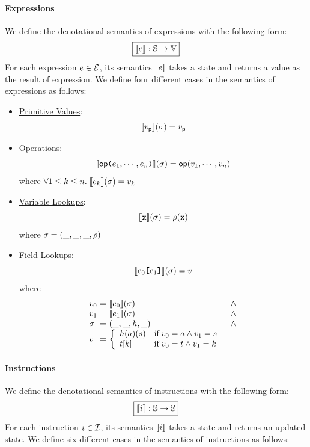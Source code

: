 \paragraph{Expressions} We define the denotational semantics of expressions with
the following form:
\[
  \framebox{$\sem{\expr}: \stset \rightarrow \valset$}
\]
For each expression $e \in \mathcal{E}$, its semantics $\llbracket{e}\rrbracket$ takes a
state and returns a value as the result of expression. We define four different
cases in the semantics of expressions as
follows:
\begin{itemize}
  \item \underline{Primitive Values}:
    \[
      \llbracket{v_{\textsf{p}}}\rrbracket(\sigma) = v_{\textsf{p}}
    \]

  \item \underline{Operations}:
    \[
      \llbracket{\textsf{op}\texttt{(}e_1, \cdots, e_n \texttt{)}}\rrbracket(\sigma) =
      \textsf{op}(v_1, \cdots, v_n)
    \]
    where $\forall 1 \leq k \leq n. \; \llbracket{e_k}\rrbracket(\sigma) = v_k$

  \item \underline{Variable Lookups}:
    \[
      \llbracket{\texttt{x}}\rrbracket(\sigma) = \rho(\texttt{x})
    \]
    where $\sigma = (\_, \_, \_, \rho)$

  \item \underline{Field Lookups}:
    \[
      \llbracket{e_0 \texttt{[}e_1 \texttt{]}}\rrbracket(\sigma) = v
    \]
    where
    \[
      \begin{array}{l@{~}c@{~}ll}
        \val_0 &=& \sem{\expr_0}(\st) &\wedge\\
        \val_1 &=& \sem{\expr_1}(\st) &\wedge\\
        \st &=& (\_, \_, \heap, \_) &\wedge\\
        \val &=& \left\{
          \begin{array}{ll}
            \heap(\addr)(\str)
            & \text{if} \; \val_0 = \addr \wedge \val_1 = \str\\
            \tree[k]
            & \text{if} \; \val_0 = \tree \wedge \val_1 = k\\
          \end{array}
        \right.\\
      \end{array}
    \]
\end{itemize}

\paragraph{Instructions} We define the denotational semantics of instructions
with the following form:
\[
  \framebox{$\sem{\inst}: \stset \rightarrow \stset$}
\]
For each instruction $i \in \mathcal{I}$, its semantics $\llbracket{i}\rrbracket$ takes a
state and returns an updated state. We define six different cases in the
semantics of instructions as follows:

